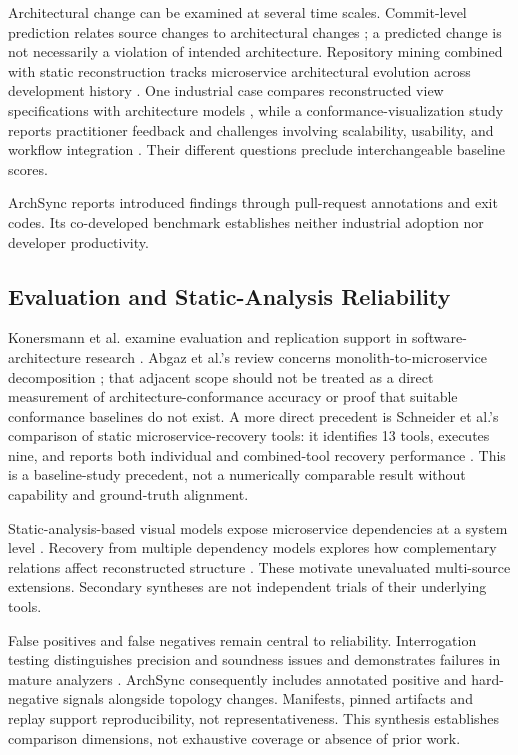 Architectural change can be examined at several time scales. Commit-level prediction relates source changes to architectural changes \cite{commits2025}; a predicted change is not necessarily a violation of intended architecture. Repository mining combined with static reconstruction tracks microservice architectural evolution across development history \cite{evolution2024}. One industrial case compares reconstructed view specifications with architecture models \cite{uzun2024drift}, while a conformance-visualization study reports practitioner feedback and challenges involving scalability, usability, and workflow integration \cite{thermofisher2025}. Their different questions preclude interchangeable baseline scores.

ArchSync reports introduced findings through pull-request annotations and exit codes. Its co-developed benchmark establishes neither industrial adoption nor developer productivity.

\subsection{Evaluation and Static-Analysis Reliability}

Konersmann et al. examine evaluation and replication support in software-architecture research \cite{konersmann2022replicability}. Abgaz et al.'s review concerns monolith-to-microservice decomposition \cite{abgaz2023decomposition}; that adjacent scope should not be treated as a direct measurement of architecture-conformance accuracy or proof that suitable conformance baselines do not exist. A more direct precedent is Schneider et al.'s comparison of static microservice-recovery tools: it identifies 13 tools, executes nine, and reports both individual and combined-tool recovery performance \cite{schneider2025comparison}. This is a baseline-study precedent, not a numerically comparable result without capability and ground-truth alignment.

Static-analysis-based visual models expose microservice dependencies at a system level \cite{staticmodels2024}. Recovery from multiple dependency models explores how complementary relations affect reconstructed structure \cite{dependencies2024}. These motivate unevaluated multi-source extensions. Secondary syntheses are not independent trials of their underlying tools.

False positives and false negatives remain central to reliability. Interrogation testing distinguishes precision and soundness issues and demonstrates failures in mature analyzers \cite{kaindlstorfer2024interrogation}. ArchSync consequently includes annotated positive and hard-negative signals alongside topology changes. Manifests, pinned artifacts and replay support reproducibility, not representativeness. This synthesis establishes comparison dimensions, not exhaustive coverage or absence of prior work.
